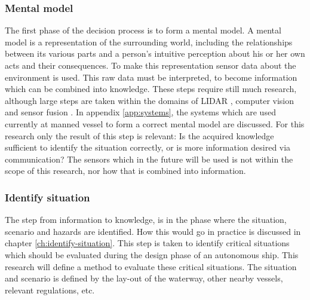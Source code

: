 \subsubsection{Mental model}
The first phase of the decision process is to form a mental model. A mental model is a representation of the surrounding world, including the relationships between its various parts and a person's intuitive perception about his or her own acts and their consequences.
To make this representation sensor data about the environment is used. This raw data must be interpreted, to become information which can be combined into knowledge. 
These steps require still much research, although large steps are taken within the domains of LIDAR \cite{Cameron2017}, computer vision \cite{Marr2017} and sensor fusion \cite{Hoffman2018}. In appendix \ref{app:systems}, the systems which are used currently at manned vessel to form a correct mental model are discussed. For this research only the result of this step is relevant: Is the acquired knowledge sufficient to identify the situation correctly, or is more information desired via communication?
The sensors which in the future will be used is not within the scope of this research, nor how that is combined into information. 

\subsubsection{Identify situation}
The step from information to knowledge, is in the phase where the situation, scenario and hazards are identified. How this would go in practice is discussed in chapter \ref{ch:identify-situation}. This step is taken to identify critical situations which should be evaluated during the design phase of an autonomous ship. 
This research will define a method to evaluate these critical situations. The situation and scenario is defined by the lay-out of the waterway, other nearby vessels, relevant regulations, etc.

